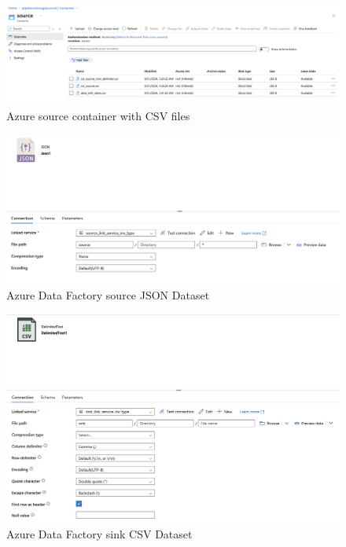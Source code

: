 \documentclass[11pt, oneside]{article}   	%
\begin{document}
\begin{figure}[H] %
   \centering
   \includegraphics[width=6in]{images/storage.png} 
   \caption{Azure source container with CSV files }
   \label{fig:storage}
\end{figure}

\begin{figure}[H] %
   \centering
   \includegraphics[width=6in]{images/sourceDataset.png} 
   \caption{Azure Data Factory source JSON Dataset}
   \label{fig:sourceDataset}
\end{figure}

\begin{figure}[H] %
   \centering
   \includegraphics[width=6in]{images/sinkDataset.png} 
   \caption{Azure Data Factory sink CSV Dataset}
   \label{fig:sinkDataset}
\end{figure}
\end{document}
